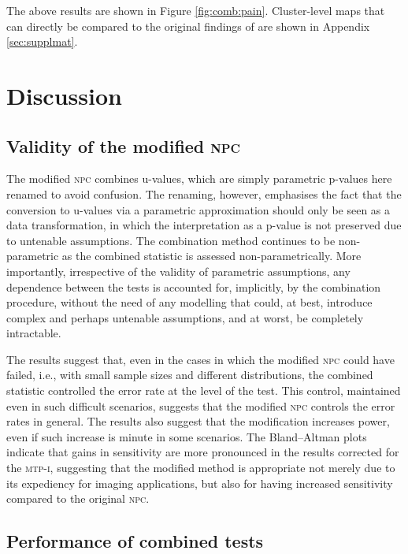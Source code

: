 The above results are shown in Figure \ref{fig:comb:pain}. Cluster-level maps that can directly be compared to the original findings of \citet{Brooks2005} are shown in Appendix \ref{sec:supplmat}.

\section{Discussion}

\subsection{Validity of the modified \textsc{npc}}

The modified \textsc{npc} combines u-values, which are simply parametric p-values here renamed to avoid confusion. The renaming, however, emphasises the fact that the conversion to u-values via a parametric approximation should only be seen as a data transformation, in which the interpretation as a p-value is not preserved due to untenable assumptions. The combination method continues to be non-parametric as the combined statistic is assessed non-parametrically. More importantly, irrespective of the validity of parametric assumptions, any dependence between the tests is accounted for, implicitly, by the combination procedure, without the need of any modelling that could, at best, introduce complex and perhaps untenable assumptions, and at worst, be completely intractable.

The results suggest that, even in the cases in which the modified \textsc{npc} could have failed, i.e., with small sample sizes and different distributions, the combined statistic controlled the error rate at the level of the test. This control, maintained even in such difficult scenarios, suggests that the modified \textsc{npc} controls the error rates in general. The results also suggest that the modification increases power, even if such increase is minute in some scenarios. The Bland--Altman plots indicate that gains in sensitivity are more pronounced in the results corrected for the \textsc{mtp-i}, suggesting that the modified method is appropriate not merely due to its expediency for imaging applications, but also for having increased sensitivity compared to the original \textsc{npc}.

\subsection{Performance of combined tests}

